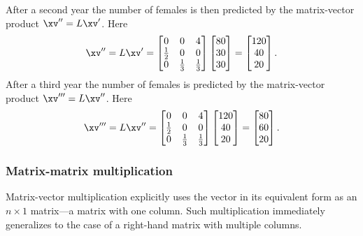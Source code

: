 \begin{example}
\begin{solution}
\begin{enumerate}
After a second year the number of females is then predicted by the matrix-vector product \(\xv''=L\xv'\).  Here
\begin{equation*}
\xv''=L\xv'=\begin{bmatrix} 0&0&4\\\frac12&0&0\\0&\frac13&\frac13 \end{bmatrix}\begin{bmatrix} 80\\30\\30 \end{bmatrix}
=\begin{bmatrix} 120\\40\\20 \end{bmatrix}.
\end{equation*}
After a third year the number of females is predicted by the matrix-vector product \(\xv'''=L\xv''\).  Here
\begin{equation*}
\xv'''=L\xv''=\begin{bmatrix} 0&0&4\\\frac12&0&0\\0&\frac13&\frac13 \end{bmatrix}\begin{bmatrix} 120\\40\\20 \end{bmatrix}
=\begin{bmatrix} 80\\60\\20 \end{bmatrix}.
\end{equation*}
\end{enumerate}
\end{solution}
\end{example}







\subsubsection{Matrix-matrix multiplication}

Matrix-vector multiplication explicitly uses the vector in its equivalent form as an \(n\times1\) matrix---a matrix with one column.
Such multiplication immediately generalizes to the case of a right-hand matrix with multiple columns.


